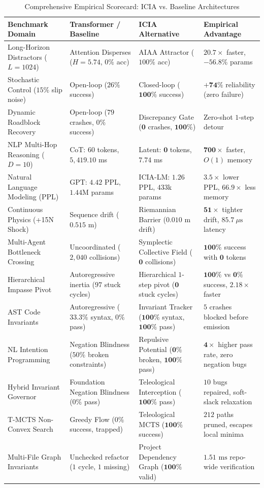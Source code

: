 \documentclass[10pt,twocolumn,letterpaper]{article}
\theoremstyle{plain}
\theoremstyle{definition}
\begin{document}
\begin{table}[t]
\centering
\small
\caption{Comprehensive Empirical Scorecard: ICIA vs. Baseline Architectures}
\label{tab:master_results}
\begin{tabular}{@{}llll@{}}
\toprule
\textbf{Benchmark Domain} & \textbf{Transformer / Baseline} & \textbf{ICIA Alternative} & \textbf{Empirical Advantage} \\
\midrule
Long-Horizon Distractors ($L=1024$) & Attention Disperses ($H=5.74$, $0\%$ acc) & AIAA Attractor ($100\%$ acc) & $\mathbf{20.7\times}$ faster, $-56.8\%$ params \\
Stochastic Control ($15\%$ slip noise) & Open-loop ($26\%$ success) & Closed-loop ($\mathbf{100\%}$ success) & $\mathbf{+74\%}$ reliability (zero failure) \\
Dynamic Roadblock Recovery & Open-loop ($79$ crashes, $0\%$ success) & Discrepancy Gate ($\mathbf{0}$ crashes, $\mathbf{100\%}$) & Zero-shot $1$-step detour \\
NLP Multi-Hop Reasoning ($D=10$) & CoT: $60$ tokens, $5,419.10$ ms & Latent: $\mathbf{0}$ tokens, $\mathbf{7.74}$ ms & $\mathbf{700\times}$ faster, $O(1)$ memory \\
Natural Language Modeling (PPL) & GPT: $4.42$ PPL, $1.44$M params & ICIA-LM: $\mathbf{1.26}$ PPL, $433$k params & $\mathbf{3.5\times}$ lower PPL, $66.9\times$ less memory \\
Continuous Physics (+15N Shock) & Sequence drift ($0.515$ m) & Riemannian Barrier ($0.010$ m drift) & $\mathbf{51\times}$ tighter drift, $85.7\ \mu\text{s}$ latency \\
Multi-Agent Bottleneck Crossing & Uncoordinated ($2,040$ collisions) & Symplectic Collective Field ($\mathbf{0}$ collisions) & $\mathbf{100\%}$ success with $\mathbf{0}$ tokens \\
Hierarchical Impasse Pivot & Autoregressive inertia ($97$ stuck cycles) & Hierarchical $1$-step pivot ($\mathbf{0}$ stuck cycles) & $\mathbf{100\%}$ vs $\mathbf{0\%}$ success, $2.18\times$ faster \\
AST Code Invariants & Autoregressive ($33.3\%$ syntax, $0\%$ pass) & Invariant Tracker ($\mathbf{100\%}$ syntax, $\mathbf{100\%}$ pass) & $5$ crashes blocked before emission \\
NL Intention Programming & Negation Blindness ($50\%$ broken constraints) & Repulsive Potential ($\mathbf{0\%}$ broken, $\mathbf{100\%}$ pass) & $\mathbf{4\times}$ higher pass rate, zero negation bugs \\
Hybrid Invariant Governor & Foundation Negation Blindness ($0\%$ pass) & Teleological Interception ($\mathbf{100\%}$ pass) & $10$ bugs repaired, soft-slack relaxation \\
T-MCTS Non-Convex Search & Greedy Flow ($0\%$ success, trapped) & Teleological MCTS ($\mathbf{100\%}$ success) & $212$ paths pruned, escapes local minima \\
Multi-File Graph Invariants & Unchecked refactor ($1$ cycle, $1$ missing) & Project Dependency Graph ($\mathbf{100\%}$ valid) & $1.51\text{ ms}$ repo-wide verification \\
\bottomrule
\end{tabular}
\end{table}
\end{document}
